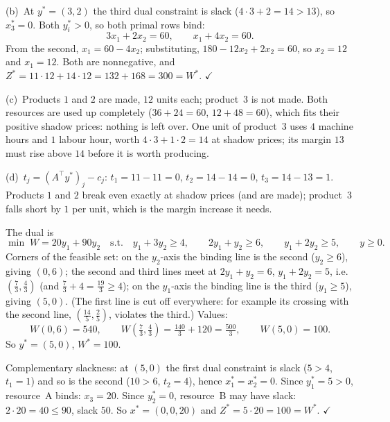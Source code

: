 \begin{solutions}
        (b)~At $y^{*}=(3,2)$ the third dual constraint is slack
        ($4\cdot3+2=14>13$), so $x_{3}^{*}=0$. Both $y_{i}^{*}>0$, so both
        primal rows bind:
        \[
          3x_{1}+2x_{2}=60,\qquad x_{1}+4x_{2}=60 .
        \]
        From the second, $x_{1}=60-4x_{2}$; substituting,
        $180-12x_{2}+2x_{2}=60$, so $x_{2}=12$ and $x_{1}=12$. Both are
        nonnegative, and
        $Z^{*}=11\cdot12+14\cdot12=132+168=300=W^{*}$. $\checkmark$

        (c)~Products $1$ and $2$ are made, $12$ units each; product~3 is
        not made. Both resources are used up completely ($36+24=60$,
        $12+48=60$), which fits their positive shadow prices: nothing is
        left over. One unit of product~3 uses $4$ machine hours and $1$
        labour hour, worth $4\cdot3+1\cdot2=14$ at shadow prices; its
        margin $13$ must rise above $14$ before it is worth producing.

        (d)~$t_{j}=(A^{\top}y^{*})_{j}-c_{j}$:
        $t_{1}=11-11=0$, $t_{2}=14-14=0$, $t_{3}=14-13=1$. Products $1$
        and $2$ break even exactly at shadow prices (and are made);
        product~3 falls short by $1$ per unit, which is the margin
        increase it needs.

  \item The dual is
        \[
          \min\; W=20y_{1}+90y_{2}
          \quad\text{s.t.}\quad
          y_{1}+3y_{2}\ge 4,\qquad 2y_{1}+y_{2}\ge 6,\qquad
          y_{1}+2y_{2}\ge 5,\qquad y\ge 0 .
        \]
        Corners of the feasible set: on the $y_{2}$-axis the binding line
        is the second ($y_{2}\ge 6$), giving $(0,6)$; the second and third
        lines meet at $2y_{1}+y_{2}=6$, $y_{1}+2y_{2}=5$, i.e.\
        $(\tfrac73,\tfrac43)$ (and $\tfrac73+4=\tfrac{19}{3}\ge 4$); on the
        $y_{1}$-axis the binding line is the third ($y_{1}\ge 5$), giving
        $(5,0)$. (The first line is cut off everywhere: for example its
        crossing with the second line, $(\tfrac{14}{5},\tfrac25)$, violates
        the third.) Values:
        \[
          W(0,6)=540,\qquad W(\tfrac73,\tfrac43)=\tfrac{140}{3}+120
          =\tfrac{500}{3},\qquad W(5,0)=100 .
        \]
        So $y^{*}=(5,0)$, $W^{*}=100$.

        Complementary slackness: at $(5,0)$ the first dual constraint is
        slack ($5>4$, $t_{1}=1$) and so is the second ($10>6$, $t_{2}=4$),
        hence $x_{1}^{*}=x_{2}^{*}=0$. Since $y_{1}^{*}=5>0$, resource~A
        binds: $x_{3}=20$. Since $y_{2}^{*}=0$, resource~B may have slack:
        $2\cdot20=40\le 90$, slack $50$. So $x^{*}=(0,0,20)$ and
        $Z^{*}=5\cdot20=100=W^{*}$. $\checkmark$


\end{solutions}
